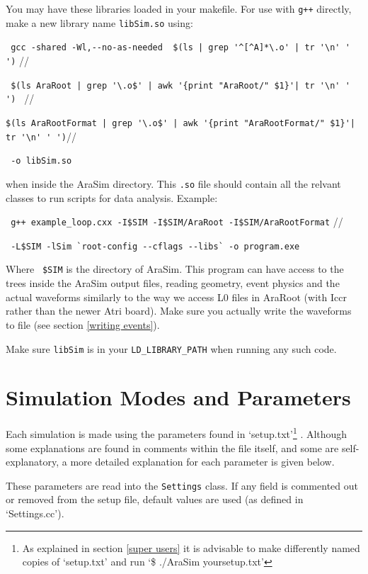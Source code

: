 \documentclass[a4paper,10pt]{article}
\newcommand{\room}{\vspace{0.3cm}}
\newcommand{\arasim}{AraSim\xspace}
\begin{document}
You may have these libraries loaded in your makefile. For use with \verb|g++| directly, make a new library name \verb|libSim.so| using:

\verb< gcc -shared -Wl,--no-as-needed  $(ls | grep '^[^A]*\.o' | tr '\n' ' ')< //

\verb< $(ls AraRoot | grep '\.o$' | awk '{print "AraRoot/" $1}'| tr '\n' ' ') < //

\verb<$(ls AraRootFormat | grep '\.o$' | awk '{print "AraRootFormat/" $1}'| tr '\n' ' ')<//

\verb< -o libSim.so<  

\room

when inside the \arasim directory. This \verb|.so| file should contain all the relvant classes to run scripts for data analysis. Example:

\verb| g++ example_loop.cxx -I$SIM -I$SIM/AraRoot -I$SIM/AraRootFormat| //

\verb| -L$SIM -lSim `root-config --cflags --libs` -o program.exe |

Where \verb| $SIM| is the directory of AraSim. This program can have access to the trees inside the \arasim output files, reading geometry, event physics and the actual waveforms similarly to the way we access L0 files in AraRoot (with Iccr rather than the newer Atri board). Make sure you actually write the waveforms to file (see section \ref{writing events}).

Make sure \verb|libSim| is in your \verb|LD_LIBRARY_PATH| when running any such code. 

\newpage


\expandarg %

\section{Simulation Modes and Parameters} \label{setup file}

Each simulation is made using the parameters found in `setup.txt'\footnote{As explained in section 
\ref{super users} it is advisable to make differently named copies of `setup.txt' and run `\$ ./AraSim yoursetup.txt' }  . Although some explanations are found in comments within the file itself, and some are self-explanatory, a more detailed explanation for each parameter is given below. 

\room

These parameters are read into the \verb|Settings| class. If any field is commented out or removed from the setup file, default values are used (as defined in `Settings.cc'). 
\end{document}
